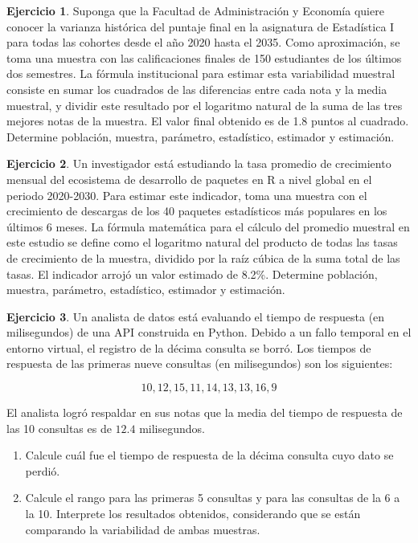 \documentclass[
  11pt,
]{book}
\theoremstyle{definition}
\theoremstyle{definition}
\theoremstyle{definition}
\newtheorem{exercise}{Ejercicio}[chapter]
\theoremstyle{definition}
\theoremstyle{remark}
\begin{document}
\begin{exercise}
Suponga que la Facultad de Administración y Economía quiere conocer la varianza histórica del puntaje final en la asignatura de Estadística I para todas las cohortes desde el año 2020 hasta el 2035. Como aproximación, se toma una muestra con las calificaciones finales de 150 estudiantes de los últimos dos semestres. La fórmula institucional para estimar esta variabilidad muestral consiste en sumar los cuadrados de las diferencias entre cada nota y la media muestral, y dividir este resultado por el logaritmo natural de la suma de las tres mejores notas de la muestra. El valor final obtenido es de 1.8 puntos al cuadrado. Determine población, muestra, parámetro, estadístico, estimador y estimación.
\end{exercise}

\begin{exercise}
Un investigador está estudiando la tasa promedio de crecimiento mensual del ecosistema de desarrollo de paquetes en R a nivel global en el periodo 2020-2030. Para estimar este indicador, toma una muestra con el crecimiento de descargas de los 40 paquetes estadísticos más populares en los últimos 6 meses. La fórmula matemática para el cálculo del promedio muestral en este estudio se define como el logaritmo natural del producto de todas las tasas de crecimiento de la muestra, dividido por la raíz cúbica de la suma total de las tasas. El indicador arrojó un valor estimado de 8.2\%. Determine población, muestra, parámetro, estadístico, estimador y estimación.
\end{exercise}

\begin{exercise}

Un analista de datos está evaluando el tiempo de respuesta (en milisegundos) de una API construida en Python. Debido a un fallo temporal en el entorno virtual, el registro de la décima consulta se borró. Los tiempos de respuesta de las primeras nueve consultas (en milisegundos) son los siguientes:

\[10, 12, 15, 11, 14, 13, 13, 16, 9\]

El analista logró respaldar en sus notas que la media del tiempo de respuesta de las 10 consultas es de \(12.4\) milisegundos.

\begin{enumerate}
\def\labelenumi{\arabic{enumi}.}
\item
  Calcule cuál fue el tiempo de respuesta de la décima consulta cuyo dato se perdió.
\item
  Calcule el rango para las primeras 5 consultas y para las consultas de la 6 a la 10. Interprete los resultados obtenidos, considerando que se están comparando la variabilidad de ambas muestras.
\end{enumerate}

\end{exercise}
\end{document}
